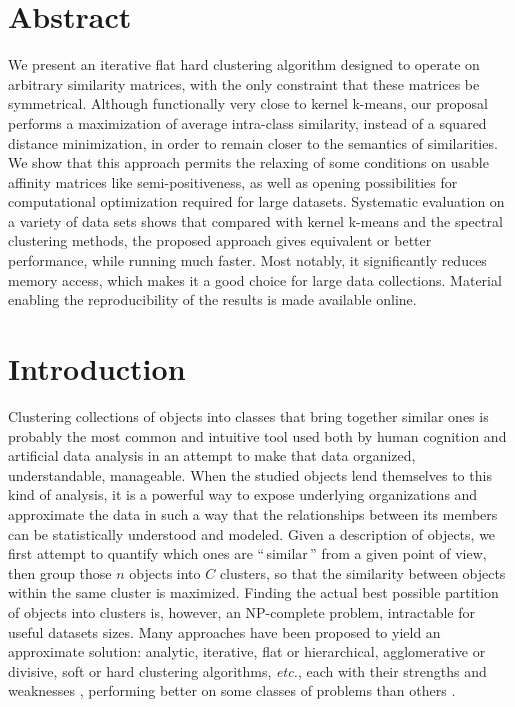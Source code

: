 \documentclass[10pt,letterpaper]{article}
\begin{document}
\section*{Abstract}
We present an iterative flat hard clustering algorithm designed to operate on arbitrary similarity matrices, with the only constraint that these matrices be symmetrical. Although functionally very close to kernel k-means, our proposal performs a maximization of average intra-class similarity, instead of a squared distance minimization, in order to remain closer to the semantics of similarities. We show that this approach permits the relaxing of some conditions on usable affinity matrices like semi-positiveness, as well as opening possibilities for computational optimization required for large datasets. Systematic evaluation on a variety of data sets shows that compared with kernel k-means and the spectral clustering methods, the proposed approach gives equivalent or better performance, while running much faster. Most notably, it significantly reduces memory access, which makes it a good choice for large data collections. Material enabling the reproducibility of the results is made available online.

\linenumbers



\section*{Introduction}

Clustering collections of objects into classes that bring together similar ones is probably the most common and intuitive tool used both by human cognition and artificial data analysis in an attempt to make that data organized, understandable, manageable. When the studied objects lend themselves to this kind of analysis, it is a powerful way to expose underlying organizations and approximate the data in such a way that the relationships between its members can be statistically understood and modeled. Given a description of objects, we first attempt to quantify which ones are ``\,similar\,'' from a given point of view, then group those $n$ objects into $C$ clusters, so that the similarity between objects within the same cluster is maximized. Finding the actual best possible partition of objects into clusters is, however, an NP-complete problem, intractable for useful datasets sizes. Many approaches have been proposed to yield an approximate solution: analytic, iterative, flat or hierarchical, agglomerative or divisive, soft or hard clustering algorithms, \textit{etc.}, each with their strengths and weaknesses \cite{jain2010data}, performing better on some classes of problems than others \cite{steinbach2000comparison,thalamuthu2006evaluation}.
\end{document}
